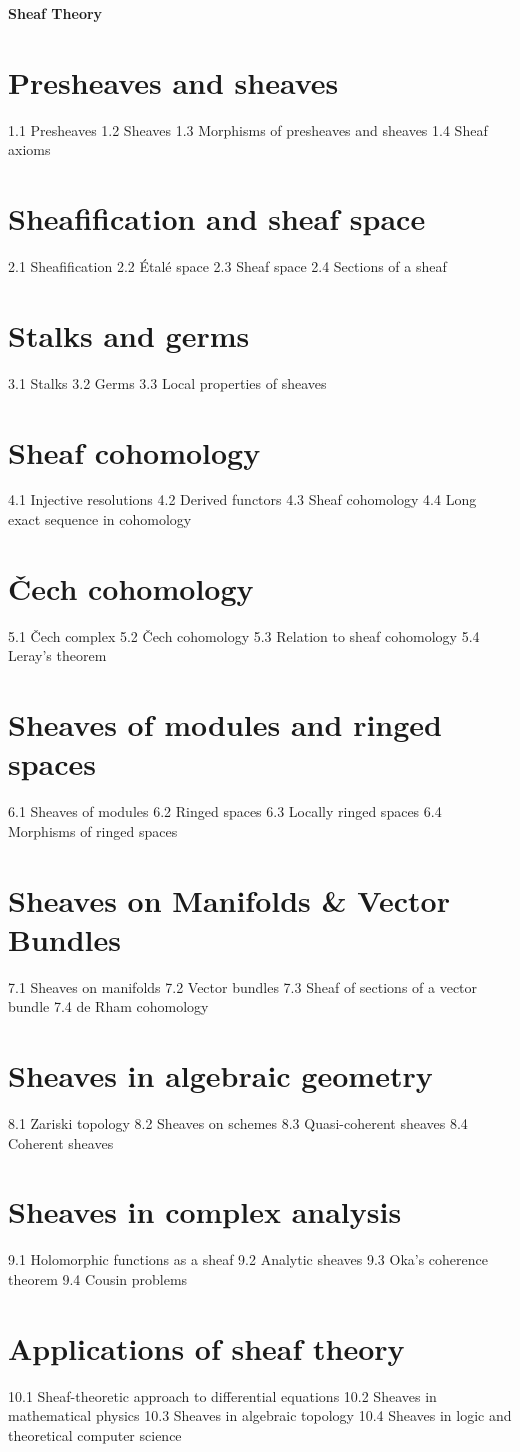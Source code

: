 ﻿{\LARGE \bf{Sheaf Theory}}
\section{Presheaves and sheaves}
1.1 Presheaves
1.2 Sheaves
1.3 Morphisms of presheaves and sheaves
1.4 Sheaf axioms
\section{Sheafification and sheaf space}
2.1 Sheafification
2.2 Étalé space
2.3 Sheaf space
2.4 Sections of a sheaf
\section{Stalks and germs}
3.1 Stalks
3.2 Germs
3.3 Local properties of sheaves
\section{Sheaf cohomology}
4.1 Injective resolutions
4.2 Derived functors
4.3 Sheaf cohomology
4.4 Long exact sequence in cohomology
\section{Čech cohomology}
5.1 Čech complex
5.2 Čech cohomology
5.3 Relation to sheaf cohomology
5.4 Leray's theorem
\section{Sheaves of modules and ringed spaces}
6.1 Sheaves of modules
6.2 Ringed spaces
6.3 Locally ringed spaces
6.4 Morphisms of ringed spaces
\section{Sheaves on Manifolds \& Vector Bundles}
7.1 Sheaves on manifolds
7.2 Vector bundles
7.3 Sheaf of sections of a vector bundle
7.4 de Rham cohomology
\section{Sheaves in algebraic geometry}
8.1 Zariski topology
8.2 Sheaves on schemes
8.3 Quasi-coherent sheaves
8.4 Coherent sheaves
\section{Sheaves in complex analysis}
9.1 Holomorphic functions as a sheaf
9.2 Analytic sheaves
9.3 Oka's coherence theorem
9.4 Cousin problems
\section{Applications of sheaf theory}
10.1 Sheaf-theoretic approach to differential equations
10.2 Sheaves in mathematical physics
10.3 Sheaves in algebraic topology
10.4 Sheaves in logic and theoretical computer science
